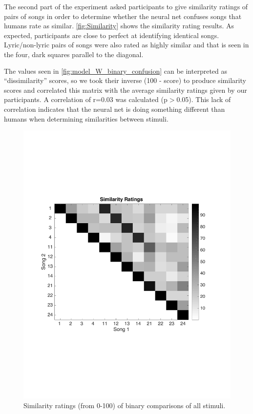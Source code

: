 The second part of the experiment asked participants to give similarity ratings of pairs of songs in order to determine whether the neural net confuses songs that humans rate as similar. 
\autoref{fig:Similarity} shows the similarity rating results. 
As expected, participants are close to perfect at identifying identical songs. 
Lyric/non-lyric pairs of songs were also rated as highly similar and that is seen in the four, dark squares parallel to the diagonal.

The values seen in \autoref{fig:model_W_binary_confusion} can be interpreted as ``dissimilarity'' scores, so we took their inverse (100 - score) to produce similarity scores and correlated this matrix with the average similarity ratings given by our participants.
A correlation of r=0.03 was calculated (p$>$0.05).
This lack of correlation indicates that the neural net is doing something different than humans when determining similarities between stimuli. 
\begin{figure}[htb] 
  \begin{center}
    \includegraphics[scale=0.6]{Figures/Similarity}
    \caption{Similarity ratings (from 0-100) of binary comparisons of all stimuli.}
    \label{fig:Similarity}
  \end{center}
\end{figure}